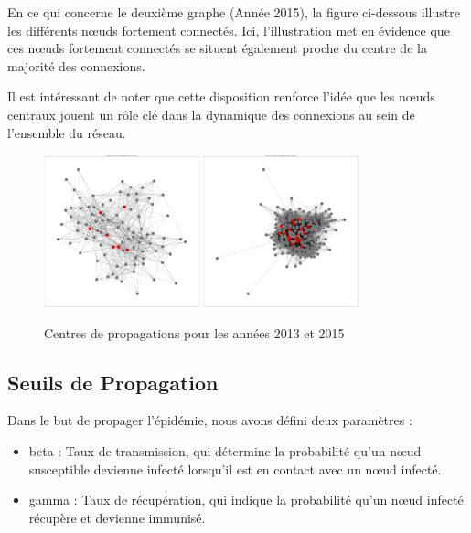 \documentclass{article}
\begin{document}
En ce qui concerne le deuxième graphe (Année 2015), la figure ci-dessous illustre les différents nœuds fortement connectés. Ici, l'illustration met en évidence que ces nœuds fortement connectés se situent également proche du centre de la majorité des connexions.

Il est intéressant de noter que cette disposition renforce l'idée que les nœuds centraux jouent un rôle clé dans la dynamique des connexions au sein de l'ensemble du réseau.

\begin{figure}[!h]
    \centering
    \includegraphics[width=0.40\textwidth]{assets/epidemiologie/centre_propa_2013}
    \hfill
    \includegraphics[width=0.40\textwidth]{assets/epidemiologie/centre_propa_2015}
    \caption{Centres de propagations pour les années 2013 et 2015}
    \label{fig:centre_propa_parallel}
\end{figure}

\subsection{Seuils de Propagation}

\noindent
Dans le but de propager l'épidémie, nous avons défini deux paramètres :
\begin{itemize}
    \item beta : Taux de transmission, qui détermine la probabilité qu'un nœud susceptible devienne infecté lorsqu'il est en contact avec un nœud infecté.
    \item gamma : Taux de récupération, qui indique la probabilité qu'un nœud infecté récupère et devienne immunisé. \\
\end{itemize}
\end{document}
